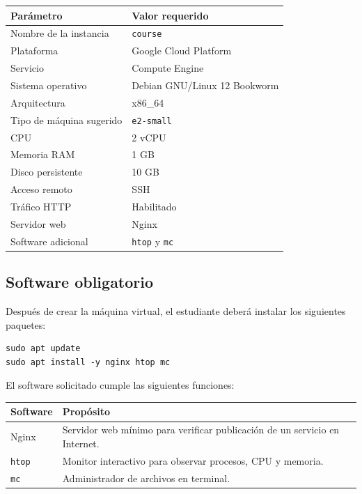 \documentclass[
  coursetitle={Cómputo Nube y Tecnologías Emergentes},
  coursehours={96},
  coursedate={Verano 2026},
  doctype={Tarea 2},
  otherlangs={english,french},
  authorname={Lázaro},
  authorsurname={Bustio-Martínez},
  authortitle={PhD},
  role={Profesor Investigador},
  email={lbustio@inaoe.mx},
  phone={5559504000},
  ext={7459},
  institution={Instituto Nacional de Astrofísica, Óptica y Electrónica (INAOE)},
  department={Maestría en Ciencias en Tecnologías de Seguridad},
  address={Luis Enrique Erro 1, Sta. Ma. Tonantzintla, San Andrés Cholula, CP 72840, Puebla, México},
  margin={0.5in}
]{../../../lbustio_lecture_notes}
\begin{document}
\begin{center}
\begin{tabular}{|p{}|p{}|}
\hline
\textbf{Parámetro} & \textbf{Valor requerido} \\
\hline
Nombre de la instancia & \texttt{course} \\
\hline
Plataforma & Google Cloud Platform \\
\hline
Servicio & Compute Engine \\
\hline
Sistema operativo & Debian GNU/Linux 12 Bookworm \\
\hline
Arquitectura & x86\_64 \\
\hline
Tipo de máquina sugerido & \texttt{e2-small} \\
\hline
CPU & 2 vCPU \\
\hline
Memoria RAM & 1 GB \\
\hline
Disco persistente & 10 GB \\
\hline
Acceso remoto & SSH \\
\hline
Tráfico HTTP & Habilitado \\
\hline
Servidor web & Nginx \\
\hline
Software adicional & \texttt{htop} y \texttt{mc} \\
\hline
\end{tabular}
\end{center}

\subsection{Software obligatorio}
\label{sec:tarea2-software}

Después de crear la máquina virtual, el estudiante deberá instalar los siguientes paquetes:

\begin{verbatim}
sudo apt update
sudo apt install -y nginx htop mc
\end{verbatim}

El software solicitado cumple las siguientes funciones:

\begin{center}
\begin{tabular}{|p{}|p{}|}
\hline
\textbf{Software} & \textbf{Propósito} \\
\hline
Nginx & Servidor web mínimo para verificar publicación de un servicio en Internet. \\
\hline
\texttt{htop} & Monitor interactivo para observar procesos, CPU y memoria. \\
\hline
\texttt{mc} & Administrador de archivos en terminal. \\
\hline
\end{tabular}
\end{center}
\end{document}
